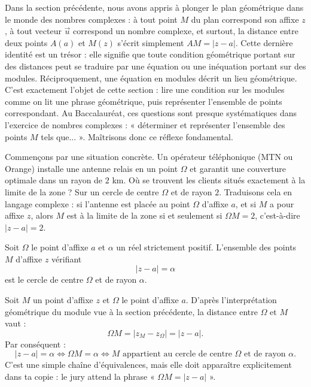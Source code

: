\documentclass[11pt]{article}
\newcommand{\cle}[1]{{\popxbold\color{popdark}#1}}
\newcounter{popsec}
\newcounter{popsub}
\newcommand{\courssub}[1]{%
  \stepcounter{popsub}%
  \par\vspace{9pt}\noindent{\popxbold\fontsize{11.5}{13}\selectfont\color{popink}{\color{poporange}\thepopsec.\thepopsub}\hspace{6pt}#1}\par\nopagebreak\vspace{4pt}
}
\begin{document}
Dans la section précédente, nous avons appris à plonger le plan géométrique dans le monde des nombres complexes : à tout point $M$ du plan correspond son \cle{affixe} $z$, à tout vecteur $\vec{u}$ correspond un nombre complexe, et surtout, la distance entre deux points $A(a)$ et $M(z)$ s'écrit simplement $AM = |z - a|$. Cette dernière identité est un trésor : elle signifie que toute condition géométrique portant sur des distances peut se traduire par une équation ou une inéquation portant sur des modules. Réciproquement, une équation en modules décrit un lieu géométrique. C'est exactement l'objet de cette section : lire une condition sur les modules comme on lit une phrase géométrique, puis représenter l'ensemble de points correspondant. Au Baccalauréat, ces questions sont presque systématiques dans l'exercice de nombres complexes : « déterminer et représenter l'ensemble des points $M$ tels que... ». Maîtrisons donc ce réflexe fondamental.

\courssub{Le cercle : ensemble des points tels que $|z - a| = \alpha$}

Commençons par une situation concrète. Un opérateur téléphonique (MTN ou Orange) installe une antenne relais en un point $\Omega$ et garantit une couverture optimale dans un rayon de $2$ km. Où se trouvent les clients situés exactement à la limite de la zone ? Sur un cercle de centre $\Omega$ et de rayon $2$. Traduisons cela en langage complexe : si l'antenne est placée au point $\Omega$ d'affixe $a$, et si $M$ a pour affixe $z$, alors $M$ est à la limite de la zone si et seulement si $\Omega M = 2$, c'est-à-dire $|z - a| = 2$.

\begin{propriete}
Soit $\Omega$ le point d'affixe $a$ et $\alpha$ un réel strictement positif. L'ensemble des points $M$ d'affixe $z$ vérifiant
\[ |z - a| = \alpha \]
est le \cle{cercle} de centre $\Omega$ et de rayon $\alpha$.
\end{propriete}

\begin{experience}
Soit $M$ un point d'affixe $z$ et $\Omega$ le point d'affixe $a$. D'après l'interprétation géométrique du module vue à la section précédente, la distance entre $\Omega$ et $M$ vaut :
\[ \Omega M = |z_M - z_\Omega| = |z - a|. \]
Par conséquent :
\[ |z - a| = \alpha \iff \Omega M = \alpha \iff M \text{ appartient au cercle de centre } \Omega \text{ et de rayon } \alpha. \]
C'est une simple chaîne d'équivalences, mais elle doit apparaître explicitement dans ta copie : le jury attend la phrase « $\Omega M = |z-a|$ ».
\end{experience}
\end{document}
